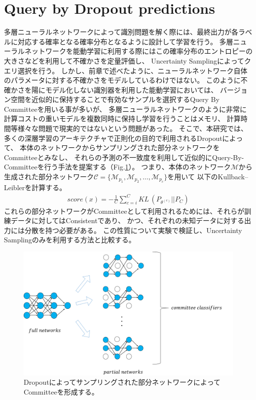 \section{Query by Dropout predictions}
多層ニューラルネットワークによって識別問題を解く際には、最終出力が各ラベルに対応する確率となる確率分布となるように設計して学習を行う。
多層ニューラルネットワークを能動学習に利用する際にはこの確率分布のエントロピーの大きさなどを利用して不確かさを定量評価し、
Uncertainty Samplingによってクエリ選択を行う。
しかし、前章で述べたように、ニューラルネットワーク自体のパラメータに対する不確かさをモデルしているわけではない。
このように不確かさを陽にモデル化しない識別器を利用した能動学習においては、
バージョン空間を近似的に保持することで有効なサンプルを選択するQuery By Committeeを用いる事が多いが、
多層ニューラルネットワークのように非常に計算コストの重いモデルを複数同時に保持し学習を行うことはメモリ、
計算時間等様々な問題で現実的ではないという問題があった。
そこで、本研究では、多くの深層学習のアーキテクチャで正則化の目的で利用されるDropoutによって、
本体のネットワークからサンプリングされた部分ネットワークをCommitteeとみなし、
それらの予測の不一致度を利用して近似的にQuery-By-Committeeを行う手法を提案する（Fig.\ref{fig:query_by_dropout}）。
つまり、本体のネットワーク$\mathcal{M}$から生成された部分ネットワーク$\mathcal{C} = \{\mathcal{M}_{p_1}, \mathcal{M}_{p_2}, \dots, \mathcal{M}_{p_c} \}$を用いて
以下のKullback–Leiblerを計算する。
\begin{eqnarray}
    score(x) =  -  \frac{1}{C} \sum_{c=i}^C KL \, (P_{\theta^{(c)}} || P_C)
\end{eqnarray}
これらの部分ネットワークがCommitteeとして利用されるためには、それらが訓練データに対してはConsistentであり、
かつ、それぞれの未知データに対する出力には分散を持つ必要がある。
この性質について実験で検証し、Uncertainty Samplingのみを利用する方法と比較する。

\begin{figure}[tbp]
     \begin{center}
      \includegraphics[width=120mm]{figures/query_by_dropout.png}
     \end{center}
    \caption{\label{fig:query_by_dropout}Dropoutによってサンプリングされた部分ネットワークによってCommitteeを形成する。}
\end{figure}

